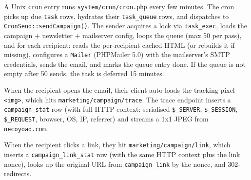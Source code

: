 \documentclass[11pt,a4paper]{article}
\begin{document}
A Unix \texttt{cron} entry runs \texttt{system/cron/cron.php} every
few minutes. The cron picks up due \texttt{task} rows, hydrates
their \texttt{task\_queue} rows, and dispatches to
\texttt{CronSend::sendCampaign()}. The sender acquires a lock via
\texttt{task\_exec}, loads the campaign + newsletter + mailserver
config, loops the queue (max 50 per pass), and for each recipient:
reads the per-recipient cached HTML (or rebuilds it if missing),
configures a \texttt{Mailer} (PHPMailer 5.0) with the mailserver's
SMTP credentials, sends the email, and marks the queue entry done.
If the queue is not empty after 50 sends, the task is deferred 15
minutes.

When the recipient opens the email, their client auto-loads the
tracking-pixel \texttt{<img>}, which hits
\texttt{marketing/campaign/trace}. The trace endpoint inserts a
\texttt{campaign\_stat} row (with full HTTP context: serialised
\texttt{\$\_SERVER}, \texttt{\$\_SESSION}, \texttt{\$\_REQUEST},
browser, OS, IP, referrer) and streams a 1x1 JPEG from
\texttt{necoyoad.com}.

When the recipient clicks a link, they hit
\texttt{marketing/campaign/link}, which inserts a
\texttt{campaign\_link\_stat} row (with the same HTTP context plus
the link nonce), looks up the original URL from
\texttt{campaign\_link} by the nonce, and 302-redirects.
\end{document}
